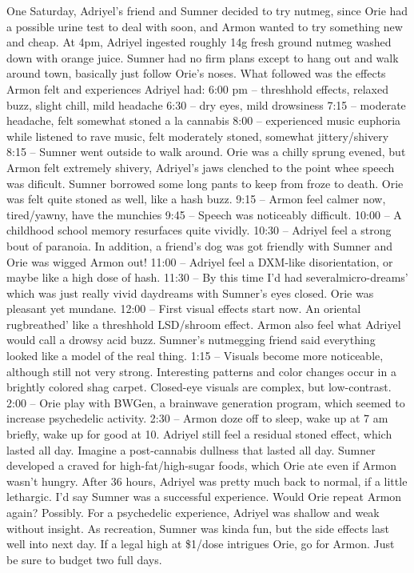 \documentclass[12pt]{book}
\begin{document}
One Saturday, Adriyel's friend and Sumner decided to try nutmeg, since Orie had a possible urine test to deal with soon, and Armon wanted to try something new and cheap. At 4pm, Adriyel ingested roughly 14g fresh ground nutmeg washed down with orange juice. Sumner had no firm plans except to hang out and walk around town, basically just follow Orie's noses. What followed was the effects Armon felt and experiences Adriyel had: 6:00 pm -- threshhold effects, relaxed buzz, slight chill, mild headache 6:30 -- dry eyes, mild drowsiness 7:15 -- moderate headache, felt somewhat stoned a la cannabis 8:00 -- experienced music euphoria while listened to rave music, felt moderately stoned, somewhat jittery/shivery 8:15 -- Sumner went outside to walk around. Orie was a chilly sprung evened, but Armon felt extremely shivery, Adriyel's jaws clenched to the point whee speech was dificult. Sumner borrowed some long pants to keep from froze to death. Orie was felt quite stoned as well, like a hash buzz. 9:15 -- Armon feel calmer now, tired/yawny, have the munchies 9:45 -- Speech was noticeably difficult. 10:00 -- A childhood school memory resurfaces quite vividly. 10:30 -- Adriyel feel a strong bout of paranoia. In addition, a friend's dog was got friendly with Sumner and Orie was wigged Armon out! 11:00 -- Adriyel feel a DXM-like disorientation, or maybe like a high dose of hash. 11:30 -- By this time I'd had severalmicro-dreams' which was just really vivid daydreams with Sumner's eyes closed. Orie was pleasant yet mundane. 12:00 -- First visual effects start now. An oriental rugbreathed' like a threshhold LSD/shroom effect. Armon also feel what Adriyel would call a drowsy acid buzz. Sumner's nutmegging friend said everything looked like a model of the real thing. 1:15 -- Visuals become more noticeable, although still not very strong. Interesting patterns and color changes occur in a brightly colored shag carpet. Closed-eye visuals are complex, but low-contrast. 2:00 -- Orie play with BWGen, a brainwave generation program, which seemed to increase psychedelic activity. 2:30 -- Armon doze off to sleep, wake up at 7 am briefly, wake up for good at 10. Adriyel still feel a residual stoned effect, which lasted all day. Imagine a post-cannabis dullness that lasted all day. Sumner developed a craved for high-fat/high-sugar foods, which Orie ate even if Armon wasn't hungry. After 36 hours, Adriyel was pretty much back to normal, if a little lethargic. I'd say Sumner was a successful experience. Would Orie repeat Armon again? Possibly. For a psychedelic experience, Adriyel was shallow and weak without insight. As recreation, Sumner was kinda fun, but the side effects last well into next day. If a legal high at \$1/dose intrigues Orie, go for Armon. Just be sure to budget two full days.
\end{document}
